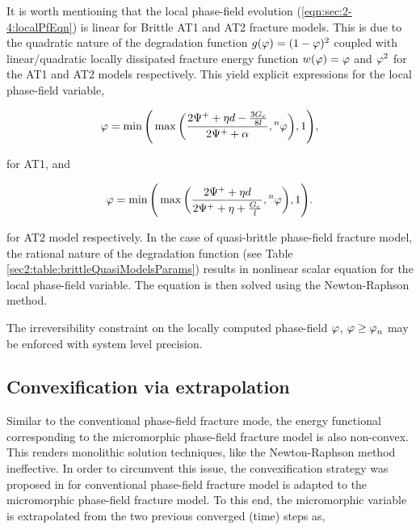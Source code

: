 \documentclass[11pt]{article}
\begin{document}
It is worth mentioning that the local phase-field evolution (\ref{eqn:sec:2-4:localPfEqn}) is linear for Brittle AT1 and AT2 fracture models. This is due to the quadratic nature of the degradation function $g(\hbox{$\varphi$}) = (1-\hbox{$\varphi$})^2$ coupled with linear/quadratic locally dissipated fracture energy function $w(\hbox{$\varphi$}) = \hbox{$\varphi$}$ and $\hbox{$\varphi$}^2$ for the AT1 and AT2 models respectively. This yield explicit expressions for the local phase-field variable,

\begin{equation}\label{eqn:sec3-2:explicitPfAT1}
    \hbox{$\varphi$} = \operatorname{min} \Bigg( \operatorname{max} \bigg( \dfrac{2 \Psi^+ + \eta \hbox{$d$} - \frac{3 G_c}{8 l}}{2 \Psi^+ + \alpha}, {}^{n}\hbox{$\varphi$} \bigg), 1 \Bigg),
\end{equation}

\noindent for AT1, and

\begin{equation}\label{eqn:sec3-2:explicitPfAT2}
    \hbox{$\varphi$} = \operatorname{min} \Bigg( \operatorname{max} \bigg( \dfrac{2 \Psi^+ + \eta \hbox{$d$}}{2 \Psi^+ + \eta + \frac{G_c}{l}}, {}^{n}\hbox{$\varphi$} \bigg), 1 \Bigg).
\end{equation}

\noindent for AT2 model respectively. In the case of quasi-brittle phase-field fracture model, the rational nature of the degradation function (see Table \ref{sec2:table:brittleQuasiModelsParams}) results in nonlinear scalar equation for the local phase-field variable. The equation is then solved using the Newton-Raphson method.

\begin{remark}
The irreversibility constraint on the locally computed phase-field $\hbox{$\varphi$}$, $\hbox{$\varphi$} \geq \hbox{$\varphi$}_n$ may be enforced with system level precision.
\end{remark}

\subsection{Convexification via extrapolation}\label{sec:ConvexifyLinElast}

Similar to the conventional phase-field fracture mode, the energy functional corresponding to the micromorphic phase-field fracture model is also non-convex. This renders monolithic solution techniques, like the Newton-Raphson method ineffective. In order to circumvent this issue, the convexification strategy was proposed in \cite{Heister2015} for conventional phase-field fracture model is adapted to the micromorphic phase-field fracture model. To this end, the micromorphic variable is extrapolated from the two previous converged (time) steps as,
\end{document}
